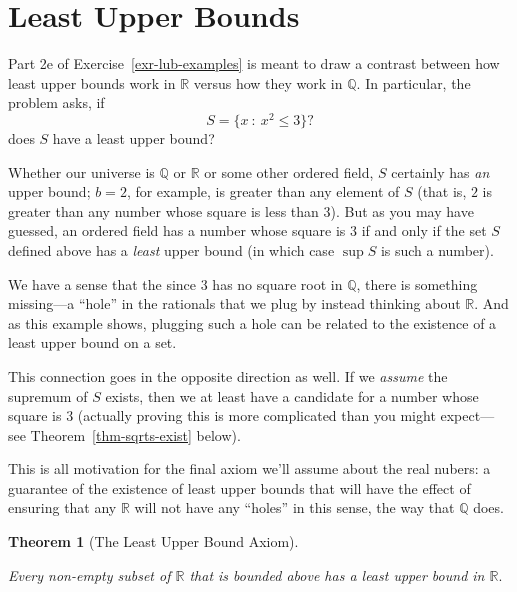 \documentclass[
  letterpaper,
  DIV=11,
  numbers=noendperiod]{scrreprt}
\def\R{\mathbb R}
\def\Q{\mathbb Q}
\newcommand{\st}{~:~}
\theoremstyle{plain}
\newtheorem{theorem}{Theorem}[chapter]
\theoremstyle{definition}
\theoremstyle{plain}
\theoremstyle{plain}
\theoremstyle{definition}
\theoremstyle{definition}
\theoremstyle{remark}
\begin{document}
\section{Least Upper Bounds}\label{least-upper-bounds}

Part 2e of Exercise~\ref{exr-lub-examples} is meant to draw a contrast
between how least upper bounds work in \(\R\) versus how they work in
\(\Q.\) In particular, the problem asks, if \[S=\{x\st x^2\leq 3\}?\]
does \(S\) have a least upper bound?

Whether our universe is \(\Q\) or \(\R\) or some other ordered field,
\(S\) certainly has \emph{an} upper bound; \(b=2\), for example, is
greater than any element of \(S\) (that is, \(2\) is greater than any
number whose square is less than 3). But as you may have guessed, an
ordered field has a number whose square is \(3\) if and only if the set
\(S\) defined above has a \emph{least} upper bound (in which case
\(\sup S\) is such a number).

We have a sense that the since \(3\) has no square root in \(\Q\), there
is something missing---a ``hole'' in the rationals that we plug by
instead thinking about \(\R\). And as this example shows, plugging such
a hole can be related to the existence of a least upper bound on a set.

This connection goes in the opposite direction as well. If we
\emph{assume} the supremum of \(S\) exists, then we at least have a
candidate for a number whose square is \(3\) (actually proving this is
more complicated than you might expect---see
Theorem~\ref{thm-sqrts-exist} below).

This is all motivation for the final axiom we'll assume about the real
nubers: a guarantee of the existence of least upper bounds that will
have the effect of ensuring that any \(\R\) will not have any ``holes''
in this sense, the way that \(\Q\) does.

\begin{theorem}[The Least Upper Bound
Axiom]\protect\hypertarget{thm-ax-lub}{}\label{thm-ax-lub}

Every non-empty subset of \(\R\) that is bounded above has a least upper
bound in \(\R.\)

\end{theorem}
\end{document}
